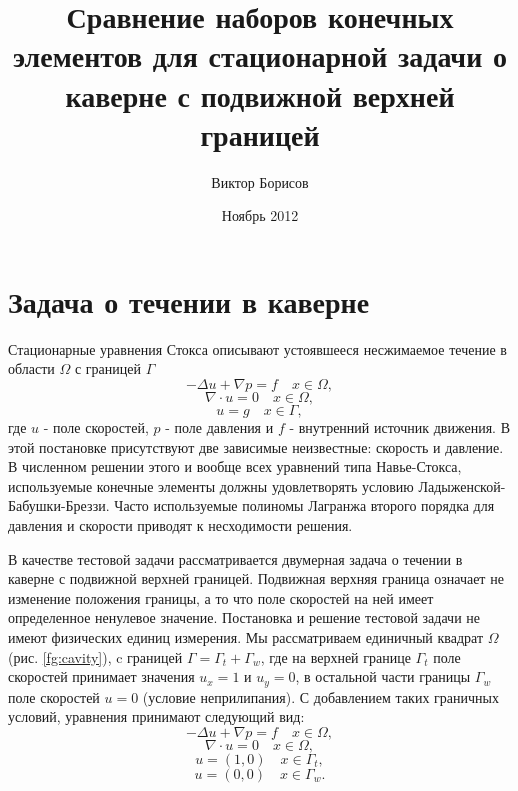 \documentclass[12pt]{article}
\title{Сравнение наборов конечных элементов для стационарной задачи о каверне с подвижной верхней границей}
\date{Ноябрь 2012}
\author{Виктор Борисов}
\begin{document}
\maketitle

\section{Задача о течении в каверне}
Стационарные уравнения Стокса описывают устоявшееся несжимаемое течение в области $\Omega$ с границей $\Gamma$
\begin{equation}
-\Delta u + \nabla p = f \quad x \in \Omega,
\end{equation}
\begin{equation}
\nabla\cdot u = 0 \quad x \in \Omega,
\end{equation}
\begin{equation}
u = g \quad x \in \Gamma,
\end{equation}
где $u$ - поле скоростей, $p$ - поле давления и $f$ - внутренний источник движения.
В этой постановке присутствуют две зависимые неизвестные: скорость и давление.
В численном решении этого и вообще всех уравнений типа Навье-Стокса, используемые конечные элементы должны удовлетворять условию Ладыженской-Бабушки-Бреззи. Часто используемые полиномы Лагранжа второго порядка для давления и скорости приводят к несходимости решения.

В качестве тестовой задачи рассматривается двумерная задача о течении в каверне с подвижной верхней границей. Подвижная верхняя граница означает не изменение положения границы, а то что поле скоростей на ней имеет определенное ненулевое значение. Постановка и решение тестовой задачи не имеют физических единиц измерения. Мы рассматриваем единичный квадрат $\Omega$ (рис. \ref{fg:cavity}), c границей $\Gamma=\Gamma_t + \Gamma_w$, где на верхней границе $\Gamma_t$ поле скоростей принимает значения $u_x=1$ и $u_y=0$, в остальной части границы $\Gamma_w$ поле скоростей $u=0$ (условие неприлипания).
С добавлением таких граничных условий, уравнения принимают следующий вид:
\begin{equation}
-\Delta u + \nabla p = f \quad x \in \Omega,
\end{equation}
\begin{equation}
\nabla\cdot u = 0 \quad x \in \Omega,
\end{equation}
\begin{equation}
u = (1, 0) \quad x \in \Gamma_t,
\end{equation}
\begin{equation}
u = (0, 0) \quad x \in \Gamma_w.
\end{equation}
\end{document}
